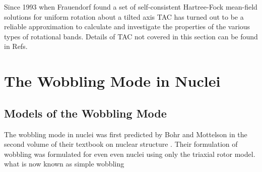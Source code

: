 Since 1993 when Frauendorf found a set of self-consistent Hartree-Fock mean-field solutions for uniform rotation about a tilted axis \cite{frauendorfTiltedCranking} TAC has turned out to be a reliable approximation to calculate and investigate the properties of the various types of rotational bands. Details of TAC not covered in this section can be found in Refs. \cite{frauendorfTiltedCranking,frauendorfTACMultiQPBands,frauendorfChirality,frauendorfTAC}

\section{The Wobbling Mode in Nuclei}
\label{sec:models-wobbling}
\subsection{Models of the Wobbling Mode}
The wobbling mode in nuclei was first predicted by Bohr and Mottelson in the second volume of their textbook on nuclear structure \cite{bohrMottelson2}. Their formulation of wobbling was formulated for even even nuclei using only the triaxial rotor model. what is now known as simple wobbling
